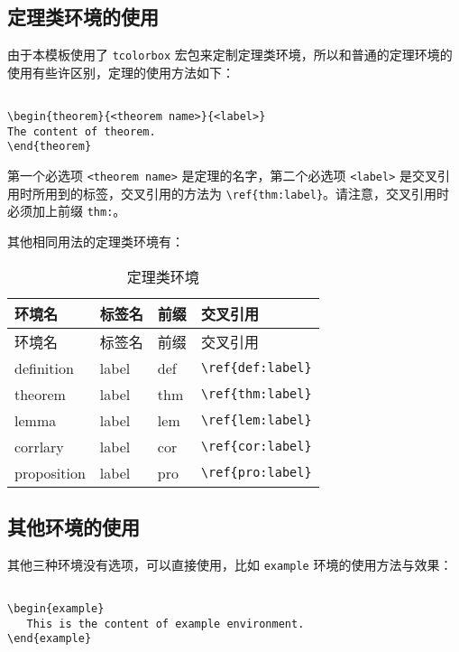 \documentclass[cn,11pt,fancy,hide]{elegantbook}
\begin{document}
\hypertarget{section-5}{%
\subsection{定理类环境的使用}\label{section-5}}

由于本模板使用了 \texttt{tcolorbox} 宏包来定制定理类环境，所以和普通的定理环境的使用有些许区别，定理的使用方法如下：

\begin{lstlisting}

\begin{theorem}{<theorem name>}{<label>}
The content of theorem.
\end{theorem}

\end{lstlisting}

第一个必选项 \texttt{\textless{}theorem\ name\textgreater{}} 是定理的名字，第二个必选项 \texttt{\textless{}label\textgreater{}} 是交叉引用时所用到的标签，交叉引用的方法为 \texttt{\textbackslash{}ref\{thm:label\}}。请注意，交叉引用时必须加上前缀 \texttt{thm:}。

其他相同用法的定理类环境有：

\begin{longtable}[]{@{}llll@{}}
\caption{\label{tab:thm-env} 定理类环境}\tabularnewline
\toprule
环境名 & 标签名 & 前缀 & 交叉引用\tabularnewline
\midrule
\endfirsthead
\toprule
环境名 & 标签名 & 前缀 & 交叉引用\tabularnewline
\midrule
\endhead
definition & label & def & \texttt{\textbackslash{}ref\{def:label\}}\tabularnewline
theorem & label & thm & \texttt{\textbackslash{}ref\{thm:label\}}\tabularnewline
lemma & label & lem & \texttt{\textbackslash{}ref\{lem:label\}}\tabularnewline
corrlary & label & cor & \texttt{\textbackslash{}ref\{cor:label\}}\tabularnewline
proposition & label & pro & \texttt{\textbackslash{}ref\{pro:label\}}\tabularnewline
\bottomrule
\end{longtable}

\hypertarget{section-6}{%
\subsection{其他环境的使用}\label{section-6}}

其他三种环境没有选项，可以直接使用，比如 \texttt{example} 环境的使用方法与效果：

\begin{lstlisting}

\begin{example}
   This is the content of example environment.
\end{example}

\end{lstlisting}
\end{document}
